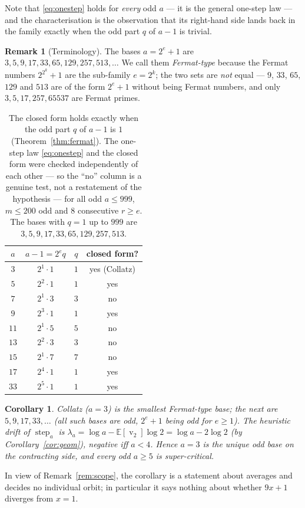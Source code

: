 \documentclass[11pt,a4paper]{article}
\theoremstyle{plain}
\newtheorem{corollary}[theorem]{Corollary}
\theoremstyle{definition}
\newtheorem{remark}[theorem]{Remark}
\newcommand{\val}{\operatorname{v}_2}
\newcommand{\step}{\operatorname{step}}
\begin{document}
\noindent Note that \eqref{eq:onestep} holds for \emph{every} odd $a$ --- it is the general
one-step law --- and the characterisation is the observation that its right-hand side lands
back in the family exactly when the odd part $q$ of $a-1$ is trivial.

\begin{remark}[Terminology]
The bases $a=2^{e}+1$ are $3,5,9,17,33,65,129,257,513,\dots$ We call them
\emph{Fermat-type} because the Fermat numbers $2^{2^{k}}+1$ are the sub-family $e=2^{k}$;
the two sets are \emph{not} equal --- $9$, $33$, $65$, $129$ and $513$ are of the form
$2^{e}+1$ without being Fermat numbers, and only $3,5,17,257,65537$ are Fermat primes.
\end{remark}

\begin{table}[ht]\centering
\begin{tabular}{c c c c}
\toprule
$a$ & $a-1=2^{e}q$ & $q$ & closed form?\\\midrule
$3$  & $2^{1}\cdot1$  & $1$ & yes (Collatz)\\
$5$  & $2^{2}\cdot1$  & $1$ & yes\\
$7$  & $2^{1}\cdot3$  & $3$ & no\\
$9$  & $2^{3}\cdot1$  & $1$ & yes\\
$11$ & $2^{1}\cdot5$  & $5$ & no\\
$13$ & $2^{2}\cdot3$  & $3$ & no\\
$15$ & $2^{1}\cdot7$  & $7$ & no\\
$17$ & $2^{4}\cdot1$  & $1$ & yes\\
$33$ & $2^{5}\cdot1$  & $1$ & yes\\
\bottomrule
\end{tabular}
\caption{The closed form holds exactly when the odd part $q$ of $a-1$ is $1$
(Theorem~\ref{thm:fermat}). The one-step law \eqref{eq:onestep} and the closed form were
checked independently of each other --- so the ``no'' column is a genuine test, not a
restatement of the hypothesis --- for all odd $a\le999$, $m\le200$ odd and $8$ consecutive
$r\ge e$. The bases with $q=1$ up to $999$ are $3,5,9,17,33,65,129,257,513$.}
\label{tab:fermat}
\end{table}

\begin{corollary}
Collatz ($a=3$) is the smallest Fermat-type base; the next are $5,9,17,33,\dots$ (all such
bases are odd, $2^{e}+1$ being odd for $e\ge1$). The
heuristic drift of $\step_{a}$ is $\lambda_{a}=\log a-\mathbb{E}[\val]\log2=\log a-2\log2$
(by Corollary~\ref{cor:geom}), negative iff $a<4$. Hence $a=3$ is the unique odd base on the
contracting side, and every odd $a\ge5$ is super-critical.
\end{corollary}
\noindent In view of Remark~\ref{rem:scope}, the corollary is a statement about averages and
decides no individual orbit; in particular it says nothing about whether $9x+1$ diverges from
$x=1$.
\end{document}

